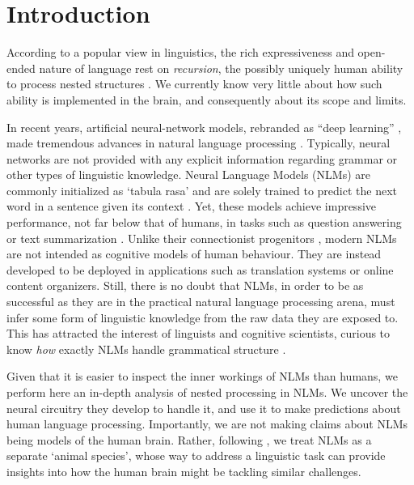 \section{Introduction}

According to a popular view in linguistics, the rich expressiveness
and open-ended nature of language rest on \emph{recursion}, the
possibly uniquely human ability to process nested structures \citep{Chomsky:1957, Hauser:etal:2002, Dehaene:etal:2015}. We
currently know very little about how such ability is implemented in
the brain, and consequently about its scope and limits.

In recent years, artificial neural-network models, rebranded as ``deep learning'' \citep{LeCun:etal:2015}, made tremendous advances in natural language processing \citep{Goldberg:2017}. Typically, neural networks are not provided with any explicit information regarding grammar or other types of linguistic knowledge. Neural Language Models (NLMs) are commonly initialized as `tabula rasa' and are solely trained to predict the next word in a sentence given its context \citep{Elman:1990}. Yet, these models achieve impressive performance, not far below that of humans, in tasks such as question answering or text summarization \citep{Radford:etal:2019}. Unlike their connectionist progenitors \citep{Rumelhart:etal:1986,Rumelhart:etal:1986b}, modern NLMs are not intended as cognitive models of human behaviour. They are instead developed to be deployed in applications such as translation systems or online content organizers. Still, there is no doubt that NLMs, in order to be as successful as they are in the practical natural language processing arena, must infer some form of linguistic knowledge from the raw data they are exposed to. This has attracted the interest of linguists and cognitive scientists, curious to know  \textit{how} exactly NLMs handle grammatical structure \citep[see][for a survey]{Linzen:Baroni:2020}.

Given that it is easier to inspect the inner workings of NLMs than humans, we perform here an in-depth analysis of nested processing in NLMs. We uncover the neural circuitry they develop to handle it, and use it to make predictions about human language processing. Importantly, we are not making claims about NLMs being models of the human brain. Rather, following \citet{McCloskey:1991}, we treat NLMs as a separate `animal species', whose way to address a linguistic task can provide insights into how the human brain might be tackling similar challenges.

